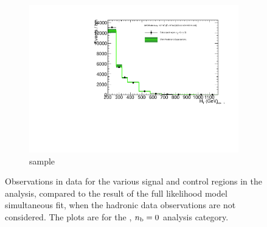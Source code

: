 \begin{figure}[h!]
\begin{subfigure}[b]{0.48\textwidth}
    \includegraphics[width=\textwidth,page=6]
    {Figs/results/v0/greenBand/bestFit_2012dev_RQcdZero_fZinvAll_0b_le3j-12p_smOnly}
    \caption{\gj sample}
  \end{subfigure}
  \caption{Observations in data for the various signal and control
  regions in the analysis, compared to the result of the full likelihood model
  simultaneous fit, when the hadronic data observations are not considered. The
  plots are for the \njlow, $n_{\text{b}} = 0$ analysis category.}
  \label{fig:green_fits_0b_le3j}
\end{figure}


